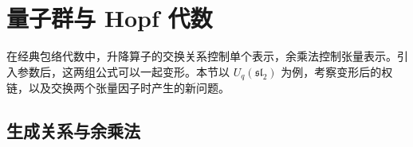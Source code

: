 %
%
\section{量子群与 Hopf 代数}
\label{b5:sec:B01}

在经典包络代数中，升降算子的交换关系控制单个表示，余乘法控制张量表示。引入参数后，这两组公式可以一起变形。本节以 \(U_q(\mathfrak{sl}_2)\) 为例，考察变形后的权链，以及交换两个张量因子时产生的新问题。

\subsection{生成关系与余乘法}
\label{b5:subsec:B01:01}

